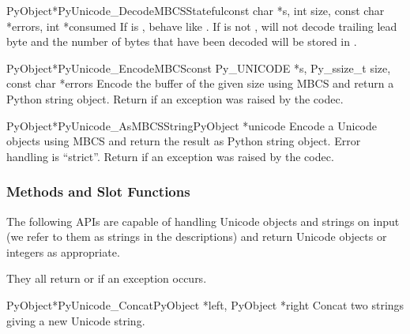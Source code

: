 \begin{cfuncdesc}{PyObject*}{PyUnicode_DecodeMBCSStateful}{const char *s,
                                               int size,
                                               const char *errors,
                                               int *consumed}
  If  is \NULL{}, behave like
  . If  is not \NULL{},
   will not decode trailing lead
  byte and the number of bytes that have been decoded will be stored in
  .
\end{cfuncdesc}

\begin{cfuncdesc}{PyObject*}{PyUnicode_EncodeMBCS}{const Py_UNICODE *s,
                                               Py_ssize_t size,
                                               const char *errors}
  Encode the  buffer of the given size using MBCS
  and return a Python string object.  Return \NULL{} if an exception
  was raised by the codec.
\end{cfuncdesc}

\begin{cfuncdesc}{PyObject*}{PyUnicode_AsMBCSString}{PyObject *unicode}
  Encode a Unicode objects using MBCS and return the result as
  Python string object.  Error handling is ``strict''.  Return
  \NULL{} if an exception was raised by the codec.
\end{cfuncdesc}


\subsubsection{Methods and Slot Functions \label{unicodeMethodsAndSlots}}

The following APIs are capable of handling Unicode objects and strings
on input (we refer to them as strings in the descriptions) and return
Unicode objects or integers as appropriate.

They all return \NULL{} or  if an exception occurs.

\begin{cfuncdesc}{PyObject*}{PyUnicode_Concat}{PyObject *left,
                                               PyObject *right}
  Concat two strings giving a new Unicode string.
\end{cfuncdesc}

